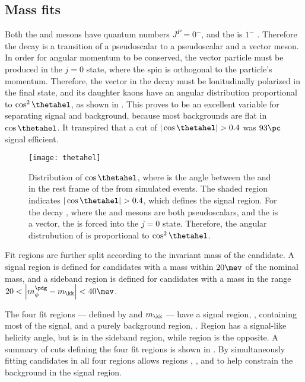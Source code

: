 \subsection{Mass fits}
\label{sec:dsphi:fit}
Both the \Bp and \Ds mesons have quantum numbers $J^P=0^-$, and the \phii is $1^-$ .
Therefore the decay \btodsphi is a transition of a pseudoscalar to a pseudoscalar and a vector
meson.
In order for angular momentum to be conserved, the vector particle must be produced in the $j=0$
state, where the spin is orthogonal to the particle's momentum.
Therefore, the vector \phii in the decay \btodsphi must be lonitudinally polarized in the final
state, and its daughter kaons have an angular distribution proportional to $\cos^2\thetahel$, as
shown in .
This proves to be an excellent variable for separating signal and background, because most
backgrounds are flat in $\cos\thetahel$.
It transpired that a cut of $|\cos\thetahel|>0.4$ was $93\pc$ signal efficient.

\begin{figure}
  \begin{center}
    \texttt{[image: thetahel]}
    \caption[Distribution of \thetahel in \btodsphi]
    {\small
      Distribution of $\cos\thetahel$, where \thetahel is the angle between the \Bp and \Kp in the
      rest frame of the \phii from simulated events.
      The shaded region indicates $|\cos\thetahel|>0.4$, which defines the signal region.
      For the decay \btodsphi, where the \Bp and \Ds mesons are both pseudoscalars, and the
      \phii is a vector, the \phii is forced into the $j=0$ state.
      Therefore, the angular distrubution of \thetahel is proportional to $\cos^2\thetahel$.
    }
    \label{fig:dsphi:hel}
  \end{center}
\end{figure}

Fit regions are further split according to the invariant mass of the \phii candidate.
A signal region is defined for \phitokk candidates with a mass within $20\mev$ of the nominal \phii
mass, and a sideband region is defined for candidates with a mass in the range
\mbox{$20<\left|m_\phi^\pdg-m_\kk\right|<40\mev$}.

The four fit regions --- defined by \thetahel and $m_{\kk}$ --- have a signal region, \rA,
containing most of the signal, and a purely background region, \rD.
Region \rB has a signal-like helicity angle, but is in the \phii sideband region, while region \rC
is the opposite.
A summary of cuts defining the four fit regions is shown in .
By simultaneously fitting \btodsphi candidates in all four regions allows regions \rB, \rC, and \rD
to help constrain the background in the signal region.

